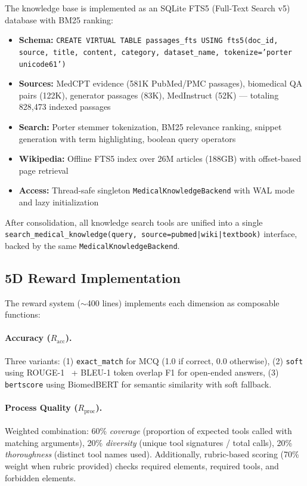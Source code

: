\documentclass{article}
\begin{document}
The knowledge base is implemented as an SQLite FTS5 (Full-Text Search v5) database with BM25 ranking:

\begin{itemize}[leftmargin=*,itemsep=1pt]
    \item \textbf{Schema:} \texttt{CREATE VIRTUAL TABLE passages\_fts USING fts5(doc\_id, source, title, content, category, dataset\_name, tokenize='porter unicode61')}
    \item \textbf{Sources:} MedCPT evidence (581K PubMed/PMC passages), biomedical QA pairs (122K), generator passages (83K), MedInstruct (52K) --- totaling 828,473 indexed passages
    \item \textbf{Search:} Porter stemmer tokenization, BM25 relevance ranking, snippet generation with term highlighting, boolean query operators
    \item \textbf{Wikipedia:} Offline FTS5 index over 26M articles (188GB) with offset-based page retrieval
    \item \textbf{Access:} Thread-safe singleton \texttt{MedicalKnowledgeBackend} with WAL mode and lazy initialization
\end{itemize}

After consolidation, all knowledge search tools are unified into a single \texttt{search\_medical\_knowledge(query, source=pubmed|wiki|textbook)} interface, backed by the same \texttt{MedicalKnowledgeBackend}.

\subsection{5D Reward Implementation}

The reward system ($\sim$400 lines) implements each dimension as composable functions:

\paragraph{Accuracy ($R_{\text{acc}}$).} Three variants: (1) \texttt{exact\_match} for MCQ (1.0 if correct, 0.0 otherwise), (2) \texttt{soft} using ROUGE-1~\citep{lin2004rouge} + BLEU-1 token overlap F1 for open-ended answers, (3) \texttt{bertscore} using BiomedBERT for semantic similarity with soft fallback.

\paragraph{Process Quality ($R_{\text{proc}}$).} Weighted combination: 60\% \emph{coverage} (proportion of expected tools called with matching arguments), 20\% \emph{diversity} (unique tool signatures / total calls), 20\% \emph{thoroughness} (distinct tool names used). Additionally, rubric-based scoring (70\% weight when rubric provided) checks required elements, required tools, and forbidden elements.
\end{document}
